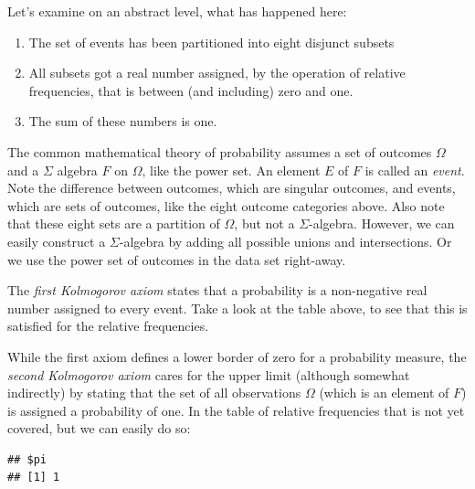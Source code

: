 \documentclass[]{svmono}
\newenvironment{Shaded}{\begin{snugshade}}{\end{snugshade}}
\newcommand{\KeywordTok}[1]{\textcolor[rgb]{0.13,0.29,0.53}{\textbf{#1}}}
\newcommand{\DataTypeTok}[1]{\textcolor[rgb]{0.13,0.29,0.53}{#1}}
\newcommand{\StringTok}[1]{\textcolor[rgb]{0.31,0.60,0.02}{#1}}
\newcommand{\CommentTok}[1]{\textcolor[rgb]{0.56,0.35,0.01}{\textit{#1}}}
\newcommand{\OperatorTok}[1]{\textcolor[rgb]{0.81,0.36,0.00}{\textbf{#1}}}
\newcommand{\NormalTok}[1]{#1}
\providecommand{\tightlist}{%
  \setlength{\itemsep}{0pt}\setlength{\parskip}{0pt}}
\theoremstyle{definition}
\theoremstyle{definition}
\theoremstyle{definition}
\theoremstyle{remark}
\begin{document}
Let's examine on an abstract level, what has happened here:

\begin{enumerate}
\def\labelenumi{\arabic{enumi}.}
\tightlist
\item
  The set of events has been partitioned into eight disjunct subsets
\item
  All subsets got a real number assigned, by the operation of relative
  frequencies, that is between (and including) zero and one.
\item
  The sum of these numbers is one.
\end{enumerate}

The common mathematical theory of probability assumes a set of outcomes
\(\Omega\) and a \(\Sigma\) algebra \(F\) on \(\Omega\), like the power
set. An element \(E\) of \(F\) is called an \emph{event}. Note the
difference between outcomes, which are singular outcomes, and events,
which are sets of outcomes, like the eight outcome categories above.
Also note that these eight sets are a partition of \(\Omega\), but not a
\(\Sigma\)-algebra. However, we can easily construct a
\(\Sigma\)-algebra by adding all possible unions and intersections. Or
we use the power set of outcomes in the data set right-away.

The \emph{first Kolmogorov axiom} states that a probability is a
non-negative real number assigned to every event. Take a look at the
table above, to see that this is satisfied for the relative frequencies.

While the first axiom defines a lower border of zero for a probability
measure, the \emph{second Kolmogorov axiom} cares for the upper limit
(although somewhat indirectly) by stating that the set of all
observations \(\Omega\) (which is an element of \(F\)) is assigned a
probability of one. In the table of relative frequencies that is not yet
covered, but we can easily do so:

\begin{Shaded}
\end{Shaded}

\begin{verbatim}
## $pi
## [1] 1
\end{verbatim}
\end{document}
